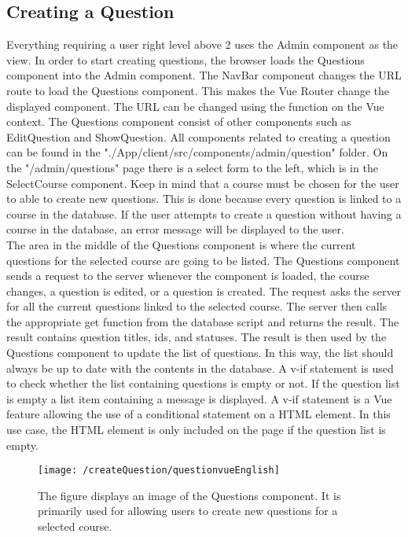 \subsection{Creating a Question}
Everything requiring a user right level above 2 uses the Admin component as the view.  In order to start creating questions, the browser loads the Questions component into the Admin component. 
The NavBar component changes the URL route to load the Questions component. This makes the Vue Router change the displayed component. The URL can be changed using the  function on the Vue context. The Questions component consist of other components such as EditQuestion and ShowQuestion. All components related to creating a question can be found in the "./App/client/src/components/admin/question" folder. On the "/admin/questions" page there is a select form to the left, which is in the SelectCourse component. Keep in mind that a course must be chosen for the user to able to create new questions. This is done because every question is linked to a course in the database.  If the user attempts to create a question without having a course in the database, an error message will be displayed to the user.
\\[11pt]
The area in the middle of the Questions component is where the current questions for the selected course are going to be listed. The Questions component sends a request to the server whenever the component is loaded, the course changes, a question is edited, or a question is created. The request asks the server for all the current questions linked to the selected course. The server then calls the appropriate get function from the database script and returns the result. The result contains question titles, ids, and statuses. The result is then used by the Questions component to update the list of questions. In this way, the list should always be up to date with the contents in the database. A v-if statement is used to check whether the list containing questions is empty or not. If the question list is empty a list item containing a message is displayed. A v-if statement is a Vue feature allowing the use of a conditional statement on a HTML element. In this use case, the HTML element is only included on the page if the question list is empty.
\begin{figure}[H]
    \centering
    \texttt{[image: /createQuestion/questionvueEnglish]}
    \caption{The figure displays an image of the Questions component. It is primarily used for allowing users to create new questions for a selected course. }
    \label{fig:questionVue}
\end{figure}

